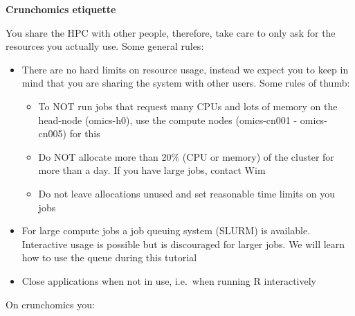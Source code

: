 \documentclass[
  letterpaper,
  DIV=11,
  numbers=noendperiod]{scrreprt}
\providecommand{\tightlist}{%
  \setlength{\itemsep}{0pt}\setlength{\parskip}{0pt}}\usepackage{longtable,booktabs,array}
\begin{document}
\begin{tcolorbox}[enhanced jigsaw, toptitle=1mm, colframe=quarto-callout-important-color-frame, opacityback=0, colbacktitle=quarto-callout-important-color!10!white, coltitle=black, rightrule=.15mm, left=2mm, toprule=.15mm, bottomtitle=1mm, colback=white, titlerule=0mm, leftrule=.75mm, title=\textcolor{quarto-callout-important-color}{\faExclamation}\hspace{0.5em}{Important}, arc=.35mm, opacitybacktitle=0.6, breakable, bottomrule=.15mm]

\textbf{Crunchomics etiquette}

You share the HPC with other people, therefore, take care to only ask
for the resources you actually use. Some general rules:

\begin{itemize}
\tightlist
\item
  There are no hard limits on resource usage, instead we expect you to
  keep in mind that you are sharing the system with other users. Some
  rules of thumb:

  \begin{itemize}
  \tightlist
  \item
    To NOT run jobs that request many CPUs and lots of memory on the
    head-node (omics-h0), use the compute nodes (omics-cn001 -
    omics-cn005) for this
  \item
    Do NOT allocate more than 20\% (CPU or memory) of the cluster for
    more than a day. If you have large jobs, contact Wim
  \item
    Do not leave allocations unused and set reasonable time limits on
    you jobs
  \end{itemize}
\item
  For large compute jobs a job queuing system (SLURM) is available.
  Interactive usage is possible but is discouraged for larger jobs. We
  will learn how to use the queue during this tutorial
\item
  Close applications when not in use, i.e.~when running R interactively
\end{itemize}

\end{tcolorbox}

On crunchomics you:
\end{document}
